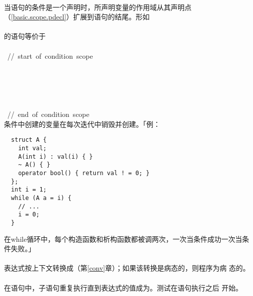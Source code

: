\paragraph{}
当语句的条件是一个声明时，所声明变量的作用域从其声明点
（\ref{basic.scope.pdecl}）扩展到语句的结尾。形如                   \\
\mbox{\qquad {} }                             \\
的语句等价于                                                        \\
\mbox{\qquad {}}                                                     \\
\mbox{\qquad \tm{\}} // start of condition scope}                             \\
\mbox{\qquad\qquad {}}                                             \\
\mbox{\qquad\qquad {}}                                            \\
\mbox{\qquad\qquad {}}                                            \\
\mbox{\qquad\qquad {}}                                          \\
\mbox{\qquad\qquad \tm{\}}}                                                   \\
\mbox{\qquad \tm{\}} // end of condition scope}                               \\
条件中创建的变量在每次迭代中销毁并创建。「例：
\begin{lstlisting}
  struct A {
    int val;
    A(int i) : val(i) { }
    ~ A() { }
    operator bool() { return val ! = 0; }
  };
  int i = 1;
  while (A a = i) {
    // ...
    i = 0;
  }
\end{lstlisting}
在while循环中，每个构造函数和析构函数都被调两次，一次当条件成功一次当条件失败。」

\paragraph{}
表达式按上下文转换成（第\ref{conv}章）；如果该转换是病态的，则程序为病
态的。

\paragraph{}
在语句中，子语句重复执行直到表达式的值成为。测试在语句执行之后
开始。

